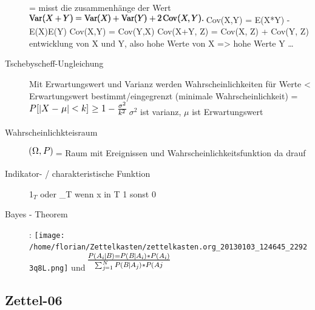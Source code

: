 \documentclass[11pt]{article}
\begin{document}
\begin{description}
           = misst die zusammenhänge der Wert
               \includegraphics[width=.9\linewidth]{conv_res.png}
            Cov(X,Y) = E(X*Y) - E(X)E(Y)
            Cov(X,Y) = Cov(Y,X)
            Cov(X+Y, Z) = Cov(X, Z) + Cov(Y, Z)
  entwicklung von X und Y, also hohe Werte von X
  => hohe Werte Y \ldots{}
\item[Tschebyscheff-Ungleichung] Mit Erwartungswert und Varianz werden Wahrscheinlichkeiten
   für Werte < Erwartungswert bestimmt/eingegrenzt (minimale Wahrscheinlichkeit)
     = \includegraphics[width=.9\linewidth]{201212ad-07253120660_2o.png}    $\sigma$$^2$ ist varianz, $\mu$ ist Erwartungswert
\item[Wahrscheinlichkteisraum] \includegraphics[width=.9\linewidth]{201212ad-15510922908saY.png} = Raum mit Ereignissen und Wahrscheinlichkeitsfunktion da drauf
\item[Indikator- / charakteristische Funktion] 1$_T$ oder _T wenn x in T 1 sonst 0
\item[Bayes - Theorem] : \texttt{[image: /home/florian/Zettelkasten/zettelkasten.org\_20130103\_124645\_22923q8L.png]}  und \includegraphics[width=.9\linewidth]{201301ad-12575411367wd2.png}
\end{description}
\subsection{Zettel-06}
\label{sec-3-6}
\end{document}
